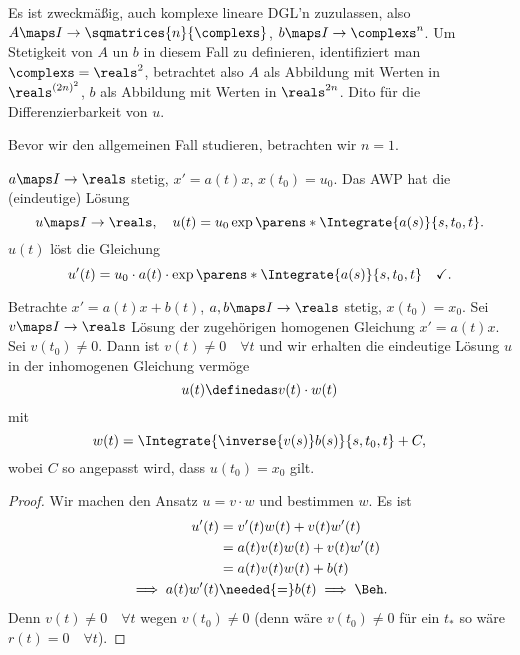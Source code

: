 \begin{bemerkung*}
  Es ist zweckmäßig, auch komplexe lineare DGL'n zuzulassen, also \( A\maps I\to \sqmatrices{n}{\complexs} \), \( b\maps I\to \complexs^n \). Um Stetigkeit von \( A \) un \( b \) in diesem Fall zu definieren, identifiziert man \( \complexs=\reals^2 \), betrachtet also \( A \) als Abbildung mit Werten in \( \reals^{(2n)^2} \), \( b \) als Abbildung mit Werten in \( \reals^{2n} \). Dito für die Differenzierbarkeit von \( u \).
\end{bemerkung*}
Bevor wir den allgemeinen Fall studieren, betrachten wir \( n=1 \).
\begin{beispiel}
  \( a\maps I\to \reals \) stetig, \( x'=a(t)x \), \( x(t_0)=u_0 \). Das AWP hat die (eindeutige) Lösung
  \begin{equation*}
    u\maps I\to \reals,\quad u(t)=u_0\exp\parens*{\Integrate{a(s)}{s,t_0,t}}.
  \end{equation*}
  \( u(t) \) löst die Gleichung
  \begin{equation*}
    u'(t)=u_0\cdot a(t)\cdot \exp\parens*{\Integrate{a(s)}{s,t_0,t}}\quad \checkmark.
  \end{equation*}
\end{beispiel}
\begin{lemma}\label{variation_der_konstanten}
  Betrachte \( x'=a(t)x+b(t) \), \( a,b\maps I\to \reals \) stetig, \( x(t_0)=x_0 \). Sei \( v\maps I\to \reals \) Lösung der zugehörigen homogenen Gleichung \( x'=a(t)x \). Sei \( v(t_0)\neq 0 \). Dann ist \( v(t)\neq 0\quad \forall t \) und wir erhalten die eindeutige Lösung \( u \) in der inhomogenen Gleichung vermöge
  \begin{equation*}
    u(t)\definedas v(t)\cdot w(t)
  \end{equation*}
  mit
  \begin{equation*}
    w(t)=\Integrate{\inverse{v(s)}b(s)}{s,t_0,t}+C,
  \end{equation*}
  wobei \( C \) so angepasst wird, dass \( u(t_0)=x_0 \) gilt.
\end{lemma}
\begin{proof}
  Wir machen den Ansatz \( u=v\cdot w \) und bestimmen \( w \). Es ist 
  \begin{align*}
    u'(t)&=v'(t)w(t)+v(t)w'(t)\\
    &=a(t)v(t)w(t)+v(t)w'(t)\\
    &=a(t)v(t)w(t)+b(t)\\
    \implies a(t)w'(t)&\needed{=}b(t)\implies \text{\Beh.}
  \end{align*}
  Denn \( v(t)\neq 0\quad \forall t \) wegen \( v(t_0)\neq 0 \) (denn wäre \( v(t_0)\neq 0 \) für ein \( t_{*} \) so wäre \( r(t)=0\quad \forall t \)).  
\end{proof}
